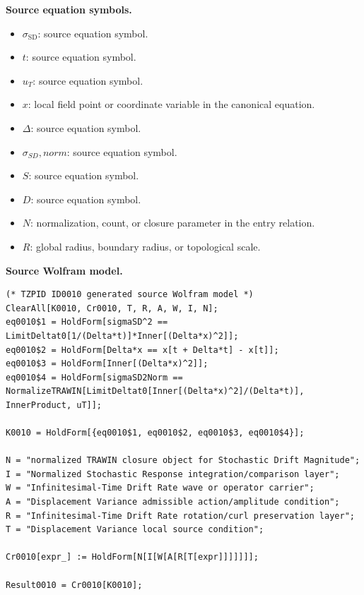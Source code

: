 \begin{minipage}[t]{0.49\linewidth}
\begingroup
\small
\raggedright
\textbf{Source equation symbols.}\par
\begin{itemize}[leftmargin=1.35em,itemsep=1pt,topsep=1pt,parsep=0pt]
    \item $\sigma_{\mathrm{SD}}$: source equation symbol.
    \item $t$: source equation symbol.
    \item $u_{T}$: source equation symbol.
    \item $x$: local field point or coordinate variable in the canonical equation.
    \item $\Delta$: source equation symbol.
    \item $\sigma_{SD},norm$: source equation symbol.
    \item $S$: source equation symbol.
    \item $D$: source equation symbol.
    \item $N$: normalization, count, or closure parameter in the entry relation.
    \item $R$: global radius, boundary radius, or topological scale.
\end{itemize}
\endgroup
\end{minipage}\hfill
\begin{minipage}[t]{0.47\linewidth}
\begingroup
\scriptsize
\raggedright
\textbf{Source Wolfram model.}\par
\begin{Verbatim}[fontsize=\tiny,breaklines=true,breakanywhere=true]
(* TZPID ID0010 generated source Wolfram model *)
ClearAll[K0010, Cr0010, T, R, A, W, I, N];
eq0010$1 = HoldForm[sigmaSD^2 == LimitDeltat0[1/(Delta*t)]*Inner[(Delta*x)^2]];
eq0010$2 = HoldForm[Delta*x == x[t + Delta*t] - x[t]];
eq0010$3 = HoldForm[Inner[(Delta*x)^2]];
eq0010$4 = HoldForm[sigmaSD2Norm == NormalizeTRAWIN[LimitDeltat0[Inner[(Delta*x)^2]/(Delta*t)], InnerProduct, uT]];

K0010 = HoldForm[{eq0010$1, eq0010$2, eq0010$3, eq0010$4}];

N = "normalized TRAWIN closure object for Stochastic Drift Magnitude";
I = "Normalized Stochastic Response integration/comparison layer";
W = "Infinitesimal-Time Drift Rate wave or operator carrier";
A = "Displacement Variance admissible action/amplitude condition";
R = "Infinitesimal-Time Drift Rate rotation/curl preservation layer";
T = "Displacement Variance local source condition";

Cr0010[expr_] := HoldForm[N[I[W[A[R[T[expr]]]]]]];

Result0010 = Cr0010[K0010];
\end{Verbatim}
\endgroup
\end{minipage}

